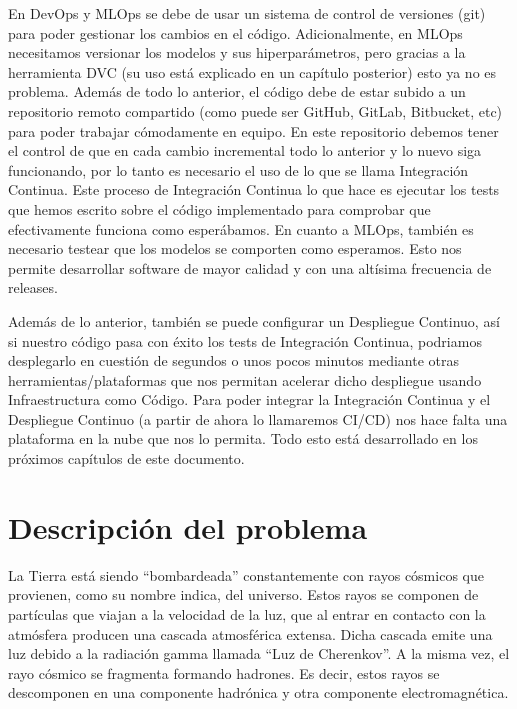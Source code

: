 En DevOps y MLOps se debe de usar un sistema de control de versiones (git) para poder gestionar los cambios en el código. Adicionalmente, en MLOps necesitamos versionar los modelos y sus hiperparámetros, pero gracias a la herramienta DVC (su uso está explicado en un capítulo posterior) esto ya no es problema. Además de todo lo anterior, el código debe de estar subido a un repositorio remoto compartido (como puede ser GitHub, GitLab, Bitbucket, etc) para poder trabajar cómodamente en equipo. En este repositorio debemos tener el control de que en cada cambio incremental todo lo anterior y lo nuevo siga funcionando, por lo tanto es necesario el uso de lo que se llama Integración Continua. Este proceso de Integración Continua lo que hace es ejecutar los tests que hemos escrito sobre el código implementado para comprobar que efectivamente funciona como esperábamos. En cuanto a MLOps, también es necesario testear que los modelos se comporten como esperamos. Esto nos permite desarrollar software de mayor calidad y con una altísima frecuencia de releases.\newline

Además de lo anterior, también se puede configurar un Despliegue Continuo, así si nuestro código pasa con éxito los tests de Integración Continua, podriamos desplegarlo en cuestión de segundos o unos pocos minutos mediante otras herramientas/plataformas que nos permitan acelerar dicho despliegue usando Infraestructura como Código. Para poder integrar la Integración Continua y el Despliegue Continuo (a partir de ahora lo llamaremos CI/CD) nos hace falta una plataforma en la nube que nos lo permita. Todo esto está desarrollado en los próximos capítulos de este documento.

\section{Descripción del problema}

La Tierra está siendo \enquote{bombardeada} constantemente con rayos cósmicos que provienen, como su nombre indica, del universo. Estos rayos se componen de partículas que viajan a la velocidad de la luz, que al entrar en contacto con la atmósfera producen una cascada atmosférica extensa. Dicha cascada emite una luz debido a la radiación gamma llamada \enquote{Luz de Cherenkov}. A la misma vez, el rayo cósmico se fragmenta formando hadrones. Es decir, estos rayos se descomponen en una componente hadrónica y otra componente electromagnética.\newline

